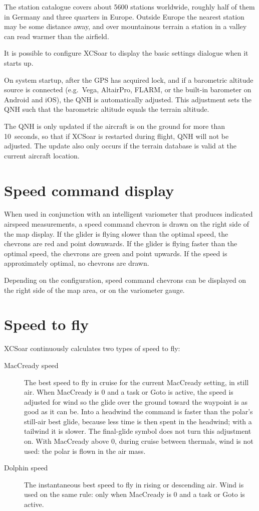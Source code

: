 \tip{} The station catalogue covers about 5600 stations worldwide,
roughly half of them in Germany and three quarters in Europe.  Outside
Europe the nearest station may be some distance away, and over
mountainous terrain a station in a valley can read warmer than the
airfield.

\tip{} It is possible to configure XCSoar to display the basic
settings dialogue when it starts up.

On system startup, after the GPS has acquired lock, and if a
barometric altitude source is connected (e.g.\ Vega, AltairPro,
FLARM, or the built-in barometer on Android and iOS), the QNH is
automatically adjusted.  This adjustment sets the
QNH such that the barometric altitude equals the terrain altitude.

The QNH is only updated if the aircraft is on the ground for more than
10~seconds, so that if XCSoar is restarted during flight, QNH will not
be adjusted.  The update also only occurs if the terrain database is
valid at the current aircraft location.

\section{Speed command display}

When used in conjunction with an intelligent variometer that produces
indicated airspeed measurements, a speed command chevron is drawn
on the right side of the map display.  If the glider is flying slower
than the optimal speed, the chevrons are red and point downwards.  If
the glider is flying faster than the optimal speed, the chevrons are
green and point upwards.  If the speed is approximately optimal, no
chevrons are drawn.


Depending on the configuration, speed command chevrons can be
displayed on the right side of the map area, or on the variometer
gauge.


\section{Speed to fly}\label{sec:stf}

XCSoar continuously calculates two types of speed to fly:
\begin{description}
\item[MacCready speed]  The best speed to fly in cruise for the
  current MacCready setting, in still air.  When MacCready is 0 and a
  task or Goto is active, the speed is adjusted for wind so the glide
  over the ground toward the waypoint is as good as it can be.  Into
  a headwind the command is faster than the polar's still-air best
  glide, because less time is then spent in the headwind; with a
  tailwind it is slower.  The final-glide symbol does not turn this
  adjustment on.  With MacCready above 0, during cruise between
  thermals, wind is not used: the polar is flown in the air mass.
\item[Dolphin speed]  The instantaneous best speed to fly in rising
  or descending air.  Wind is used on the same rule: only when
  MacCready is 0 and a task or Goto is active.
\end{description}

